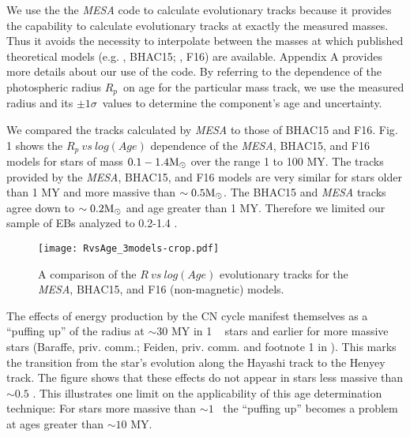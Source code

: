 \documentclass[12pt,preprint]{aastex6}
\begin{document}
We use the the {\it MESA} code to calculate evolutionary tracks
because it provides the capability to calculate evolutionary
tracks at exactly the measured masses.  Thus it avoids the necessity
to interpolate between the masses at which published theoretical 
models (e.g. \citet
{2015A&A...577A..42B}, BHAC15; \citet{2016A&A...593A...99F}, F16)
are available. 
Appendix A provides more details about our use of the  code.
By referring to the dependence of the photospheric radius $R_p$~on age 
for the particular mass track,  we use the measured radius and its 
$\pm 1 \sigma$~values to determine the component's age and uncertainty.

We compared the tracks calculated by {\it MESA} to those of 
BHAC15 and F16.  Fig. 1  shows 
the $R_p~vs~log(Age)$ dependence of the  {\it MESA}, BHAC15, 
and F16 models for stars of mass $0.1 - 1.4 \hbox{M$_\odot$}$ over 
the range 1 to 100 MY.  The tracks provided by the {\it MESA}, 
BHAC15, and F16 models are very similar for stars older than 1 
MY and more massive than $\sim 0.5 \hbox{M$_\odot$}$.  The BHAC15 and 
{\it MESA} tracks agree down to $\sim 0.2 \hbox{M$_\odot$}$ and
age greater than 1 MY. Therefore we limited our sample of EBs analyzed
to 0.2-1.4 \msun.  


\begin{figure}
\centering
{}
\texttt{[image: RvsAge\_3models-crop.pdf]}
\caption{A comparison of the $R~vs~log(Age)$ evolutionary tracks for the
{\it MESA}, BHAC15, and F16 (non-magnetic) models.}
\end{figure}

The effects of energy production by the CN cycle manifest
themselves as a ``puffing up'' of the radius at $\sim 30$ MY 
in 1 \msun~ stars and earlier for more  massive stars  
(Baraffe, priv. comm.; Feiden, priv. comm. and footnote 1 in 
\citet{2014NewAR..60....1S}).  This marks the transition from
the star's evolution along the Hayashi track  to the
Henyey track.  The figure shows that these effects do 
not appear in stars less massive than $\sim 0.5$ \msun.
This illustrates one limit on the applicability
of this age determination technique: For stars
more massive than $\sim 1$ \msun ~the  ``puffing up''
becomes a problem at ages greater than $\sim 10$ MY.
\end{document}

